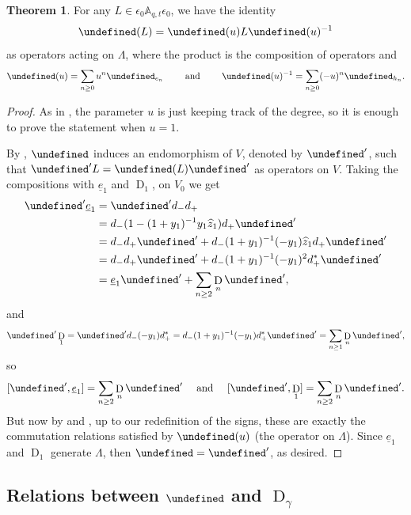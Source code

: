 \documentclass[reqno]{amsart}
\theoremstyle{plain}
\theoremstyle{definition}
\newtheorem{theorem}{Theorem}[section]
\theoremstyle{remark}
\DeclareMathOperator{\D}{D}
\newcommand{\A}{\mathbb{A}}%
\newcommand{\z}{\widehat{z}}
\let\oldTheta\Theta
\let\Theta\undefined
\DeclareMathOperator{\Theta}{\oldTheta}
\newcommand{\<}{\langle}
\renewcommand{\>}{\rangle}
\begin{document}
\begin{theorem}
    \label{thm:theta_e1_D1}
    For any $L \in \epsilon_0 \A_{q,t} \epsilon_0$, we have the identity
    \[ \Theta(L) = \Theta(u) L \Theta(u)^{-1} \]
    as operators acting on $\Lambda$, where the product is the composition of operators and
    \[ \Theta(u) = \sum_{n \geq 0} u^n \Theta_{e_n} \qquad \text{ and } \qquad \Theta(u)^{-1} = \sum_{n \geq 0} (-u)^n \Theta_{h_n}. \]
\end{theorem}

\begin{proof}
    As in , the parameter $u$ is just keeping track of the degree, so it is enough to prove the statement when $u=1$.

    By , $\Theta$ induces an endomorphism of $V$, denoted by $\Theta'$, such that $\Theta' L = \Theta(L) \Theta'$ as operators on $V$. Taking the compositions with $\underline{e}_1$ and $\D_1$, on $V_0$ we get
    \begin{align*}
        \Theta' \underline{e}_1 & = \Theta' d_- d_+ \\
        & = d_- (1 - (1+y_1)^{-1} y_1 \z_1) d_+ \Theta' \\
        & = d_- d_+ \Theta' + d_- (1+y_1)^{-1} (-y_1) \z_1 d_+ \Theta' \\
        & = d_- d_+ \Theta' + d_- (1+y_1)^{-1} (-y_1)^2 d_+^* \Theta' \\
        & = \underline{e}_1 \Theta' + \sum_{n \geq 2} \D_n \Theta',
    \end{align*}
    and
    \[ \Theta' \D_1 = \Theta' d_- (-y_1) d_+^* = d_- (1+y_1)^{-1} (-y_1) d_+^* \Theta' = \sum_{n \geq 1} \D_n \Theta', \]
    so \[ [\Theta', \underline{e}_1] = \sum_{n \geq 2} \D_n \Theta' \quad \text{ and } \quad [\Theta', \D_1] = \sum_{n \geq 2} \D_n \Theta'. \]   
    But now by \cite[Proposition~10.1]{DAdderioIraciVandenWyngaerd2021ThetaOperators} and \cite[Proposition~1.2]{Romero2022}, up to our redefinition of the signs, these are exactly the commutation relations satisfied by $\Theta(u)$ (the operator on $\Lambda$). Since $\underline{e}_1$ and $\D_1$ generate $\Lambda$, then $\Theta = \Theta'$, as desired.
\end{proof}

\subsection{Relations between \texorpdfstring{$\Theta$}{Theta} and \texorpdfstring{$\D_\gamma$}{Dgamma}}
\label{section:theta_D}
\end{document}
